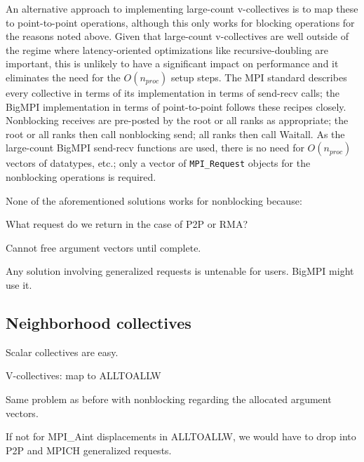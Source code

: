 
An alternative approach to implementing large-count v-collectives is to map
these to point-to-point operations, although this only works for blocking operations
for the reasons noted above.
Given that large-count v-collectives are well outside of the regime where latency-oriented 
optimizations like recursive-doubling are important, this is unlikely to have a significant impact 
on performance and it eliminates the need for the $O(n_{proc})$ setup steps.
The MPI standard describes every collective in terms of its implementation 
in terms of send-recv calls; the BigMPI implementation in terms of point-to-point
follows these recipes closely.
Nonblocking receives are pre-posted by the root or all ranks as appropriate;
the root or all ranks then call nonblocking send; all ranks then call Waitall.
As the large-count BigMPI send-recv functions are used, there is no need for
$O(n_{proc})$ vectors of datatypes, etc.; only a vector of \texttt{MPI\_Request}
objects for the nonblocking operations is required.




None of the aforementioned solutions works for nonblocking because:

What request do we return in the case of P2P or RMA?

Cannot free argument vectors until complete.

Any solution involving generalized requests is untenable for users.  BigMPI might use it.

\subsection{Neighborhood collectives}

Scalar collectives are easy.

V-collectives: map to ALLTOALLW

Same problem as before with nonblocking regarding the allocated argument vectors.

If not for MPI\_Aint displacements in ALLTOALLW, we would have to drop into P2P and MPICH generalized requests.
